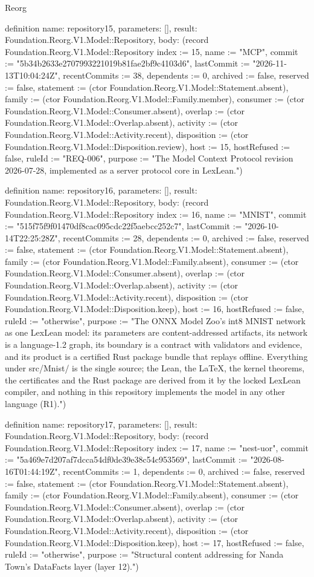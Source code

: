\begin{lexlean}{Reorg}
\begin{semanticmodule}
definition{
  name: repository15,
  parameters: [],
  result: Foundation.Reorg.V1.Model::Repository,
  body: (record Foundation.Reorg.V1.Model::Repository {index := 15, name := "MCP", commit := "5b34b2633e2707993221019b81fae2bf9c4103d6", lastCommit := "2026-11-13T10:04:24Z", recentCommits := 38, dependents := 0, archived := false, reserved := false, statement := (ctor Foundation.Reorg.V1.Model::Statement.absent), family := (ctor Foundation.Reorg.V1.Model::Family.member), consumer := (ctor Foundation.Reorg.V1.Model::Consumer.absent), overlap := (ctor Foundation.Reorg.V1.Model::Overlap.absent), activity := (ctor Foundation.Reorg.V1.Model::Activity.recent), disposition := (ctor Foundation.Reorg.V1.Model::Disposition.review), host := 15, hostRefused := false, ruleId := "REQ-006", purpose := "The Model Context Protocol revision 2026-07-28, implemented as a server protocol core in LexLean."})
}

definition{
  name: repository16,
  parameters: [],
  result: Foundation.Reorg.V1.Model::Repository,
  body: (record Foundation.Reorg.V1.Model::Repository {index := 16, name := "MNIST", commit := "515f75f9f01470df8cac095cdc22f5aebcc252c7", lastCommit := "2026-10-14T22:25:28Z", recentCommits := 28, dependents := 0, archived := false, reserved := false, statement := (ctor Foundation.Reorg.V1.Model::Statement.absent), family := (ctor Foundation.Reorg.V1.Model::Family.absent), consumer := (ctor Foundation.Reorg.V1.Model::Consumer.absent), overlap := (ctor Foundation.Reorg.V1.Model::Overlap.absent), activity := (ctor Foundation.Reorg.V1.Model::Activity.recent), disposition := (ctor Foundation.Reorg.V1.Model::Disposition.keep), host := 16, hostRefused := false, ruleId := "otherwise", purpose := "The ONNX Model Zoo's int8 MNIST network as one LexLean model: its parameters are content-addressed artifacts, its network is a language-1.2 graph, its boundary is a contract with validators and evidence, and its product is a certified Rust package bundle that replays offline. Everything under src/Mnist/ is the single source; the Lean, the LaTeX, the kernel theorems, the certificates and the Rust package are derived from it by the locked LexLean compiler, and nothing in this repository implements the model in any other language (R1)."})
}

definition{
  name: repository17,
  parameters: [],
  result: Foundation.Reorg.V1.Model::Repository,
  body: (record Foundation.Reorg.V1.Model::Repository {index := 17, name := "nest-uor", commit := "5a469e7d207af7dcca54df0de39e38c54c953569", lastCommit := "2026-08-16T01:44:19Z", recentCommits := 1, dependents := 0, archived := false, reserved := false, statement := (ctor Foundation.Reorg.V1.Model::Statement.absent), family := (ctor Foundation.Reorg.V1.Model::Family.absent), consumer := (ctor Foundation.Reorg.V1.Model::Consumer.absent), overlap := (ctor Foundation.Reorg.V1.Model::Overlap.absent), activity := (ctor Foundation.Reorg.V1.Model::Activity.recent), disposition := (ctor Foundation.Reorg.V1.Model::Disposition.keep), host := 17, hostRefused := false, ruleId := "otherwise", purpose := "Structural content addressing for Nanda Town's DataFacts layer (layer 12)."})
}


\end{semanticmodule}
\end{lexlean}
